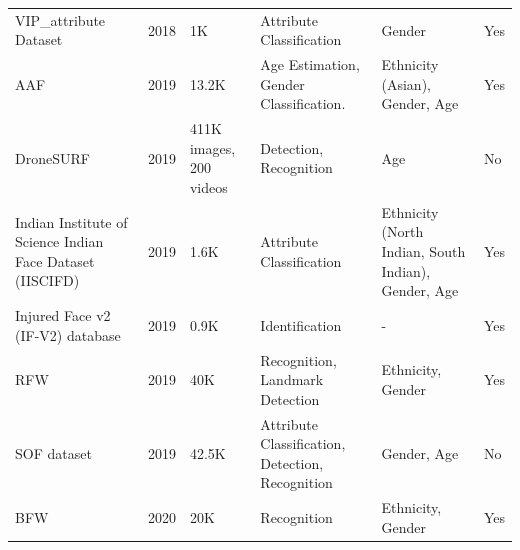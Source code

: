 \documentclass[journal]{IEEEtran}
\begin{document}
\begin{table}[!t]
\begin{tabular}{|p{}|C{0.025\textwidth}|C{0.09\textwidth}|p{0.19\textwidth}|p{0.2\textwidth}|C{0.06\textwidth}|}
VIP\_attribute Dataset \cite{dantcheva2018show}                                         & 2018          & 1K                          & Attribute Classification                                                       & Gender                                              & Yes                    \\
AAF \cite{cheng2019exploiting}                                                          & 2019          & 13.2K                       & Age Estimation, Gender Classification.                                         & Ethnicity (Asian), Gender, Age                      & Yes                    \\
DroneSURF \cite{kalra2019dronesurf}                                                     & 2019          & 411K images, 200 videos     & Detection, Recognition                                                         & Age                                                 & No                     \\
Indian Institute of Science Indian Face Dataset (IISCIFD) \cite{katti2019you}           & 2019          & 1.6K                        & Attribute Classification                                                       & Ethnicity (North Indian, South Indian), Gender, Age & Yes                    \\
Injured Face v2 (IF-V2) database \cite{majumdar2019subclass}                            & 2019          & 0.9K                        & Identification                                                                 & -                                                   & Yes                    \\
RFW \cite{wang2019racial}                                                               & 2019          & 40K                         & Recognition, Landmark Detection                                                & Ethnicity, Gender                                   & Yes                    \\
SOF dataset \cite{afifi2019afif4}                                                       & 2019          & 42.5K                       & Attribute Classification, Detection, Recognition                               & Gender, Age                                         & No                     \\
BFW \cite{robinson2020face}                                                             & 2020          & 20K                         & Recognition                                                                    & Ethnicity, Gender                                   & Yes                    \\

\end{tabular}
\end{table}
\end{document}
